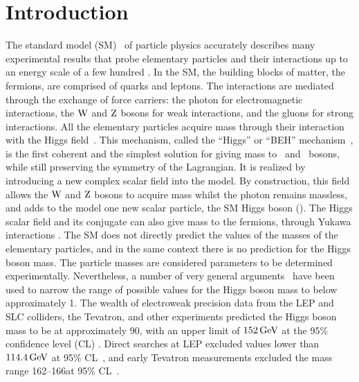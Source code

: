 \documentclass[12pt,twoside,a4paper,cmspaper,final,collab]{cms-tdr}
\begin{document}
\section{Introduction}\label{sec:introduction}
The standard model (SM)~\cite{Glashow:1961tr,Weinberg:1967tq,sm_salam} of particle physics accurately
describes many experimental results that probe elementary particles and their interactions up to
an energy scale of a few hundred \GeVns \cite{EWKlimits}.
In the SM, the building blocks of matter, the fermions, are comprised of quarks and leptons.
The interactions are mediated through the exchange of force carriers: the photon for electromagnetic
interactions, the $\mathrm{W}$ and $\mathrm{Z}$ bosons for weak interactions, and the gluons for strong interactions.
All the elementary particles acquire mass through their interaction with the Higgs
field~\cite{Englert:1964et,Higgs:1964ia,Higgs:1964pj,Guralnik:1964eu,Higgs:1966ev,Kibble:1967sv,Nambu:1961tp,NambuNobel,GellMann:1960np}.
This mechanism, called the ``Higgs'' or ``BEH''
 mechanism~\cite{Englert:1964et,Higgs:1964ia,Higgs:1964pj,Guralnik:1964eu,Higgs:1966ev,Kibble:1967sv},
is the first coherent and the simplest solution for giving mass to \PW\ and \cPZ\ bosons, while still preserving the symmetry of the
Lagrangian. It is realized by introducing a new complex scalar field into the
model. By construction,  this field allows the $\mathrm{W}$ and $\mathrm{Z}$ bosons to
acquire mass whilst the photon remains massless, and adds to the model one new scalar particle, the SM Higgs boson (\PH).
The Higgs scalar field and its conjugate can also give mass to the fermions,
through Yukawa interactions \cite{Nambu:1961tp,NambuNobel,GellMann:1960np}.
The SM does not directly predict the values of the masses of the elementary particles,
and in the same context there is no prediction for the Higgs boson mass.
The particle masses are considered parameters to be determined experimentally.
Nevertheless, a number of very general arguments~\cite{Cornwall:1973tb,Cornwall:1974km,LlewellynSmith:1973ey,Lee:1977eg}
have been used to narrow the range of possible values for the Higgs
boson mass to below approximately 1\TeV. The wealth of electroweak precision
data from the LEP and SLC colliders, the Tevatron, and other experiments
predicted the Higgs boson mass to be at approximately 90\GeV, with an upper limit of $152\,\text{Ge\hspace{-.08em}V}$ at
the 95\% confidence level (CL) \cite{EWKlimits}.  Direct searches at LEP excluded values lower
than $114.4\,\text{Ge\hspace{-.08em}V}$ at 95\% CL~\cite{LEPlimits}, and early Tevatron measurements
excluded the mass range 162--166\GeV at 95\%
CL~\cite{TEVHIGGS_2010}.
\end{document}
